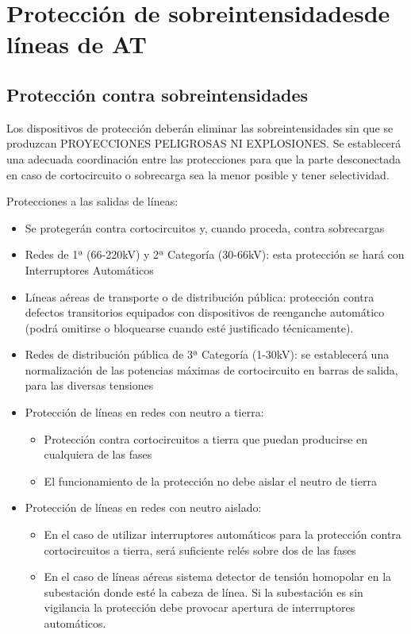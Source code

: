 \chapter{Protección de sobreintensidadesde líneas de AT}
\section{Protección contra sobreintensidades}
Los dispositivos de protección deberán eliminar las sobreintensidades sin que se produzcan PROYECCIONES PELIGROSAS NI EXPLOSIONES. Se establecerá una adecuada coordinación entre las protecciones para que la parte desconectada en caso de cortocircuito o sobrecarga sea la menor posible y tener selectividad.
\newline

Protecciones a las salidas de líneas:
\begin{itemize}
	\item Se protegerán contra cortocircuitos y, cuando proceda, contra sobrecargas
	\item Redes de 1ª (66-220kV) y 2ª Categoría (30-66kV): esta protección se hará con Interruptores Automáticos
	\item Líneas aéreas de transporte o de distribución pública: protección contra defectos transitorios equipados con dispositivos de reenganche automático (podrá omitirse o bloquearse cuando esté justificado técnicamente).
	\item Redes de distribución pública de 3ª Categoría (1-30kV): se establecerá una normalización de las potencias máximas de cortocircuito en barras de salida, para las diversas tensiones
	\item Protección de líneas en redes con neutro a tierra:
	\begin{itemize}
		\item Protección contra cortocircuitos a tierra que puedan producirse en cualquiera de las fases
		\item El funcionamiento de la protección no debe aislar el neutro de tierra
	\end{itemize}
	\item Protección de líneas en redes con neutro aislado:
	\begin{itemize}
		\item En el caso de utilizar interruptores automáticos para la protección contra cortocircuitos a tierra, será suficiente relés sobre dos de las fases
		\item En el caso de líneas aéreas sistema detector de tensión homopolar en la subestación donde esté la cabeza de línea. Si la subestación es sin vigilancia la protección debe provocar apertura de interruptores automáticos.
	\end{itemize}
\end{itemize}
